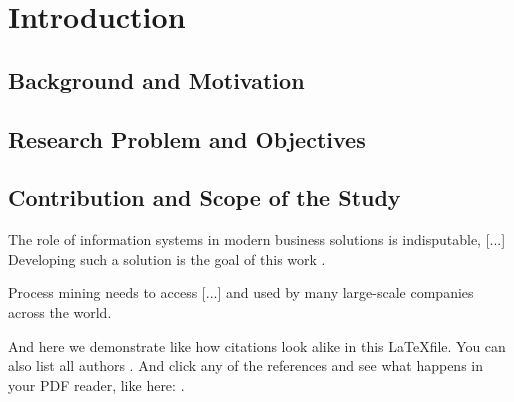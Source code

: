\newpage\section{Introduction}

\subsection{Background and Motivation}

\subsection{Research Problem and Objectives}

\subsection{Contribution and Scope of the Study}

The role of information systems in modern business solutions is indisputable, [...] Developing such a solution is the goal of this work \parencite{venkatesh_usability_2014}. 

Process mining needs to access [...] and used by many large-scale companies \parencite{hoehle_espoused_2015} across the world.

And here we demonstrate like \parencite{hoehle_espoused_2015} how citations look alike in this \LaTeX file. You can also list all authors \parencite{venkatesh_usability_2014}. And click any of the references and see what happens in your PDF reader, like here: \textcite{university_of_arkansas_mobile_2015}.
